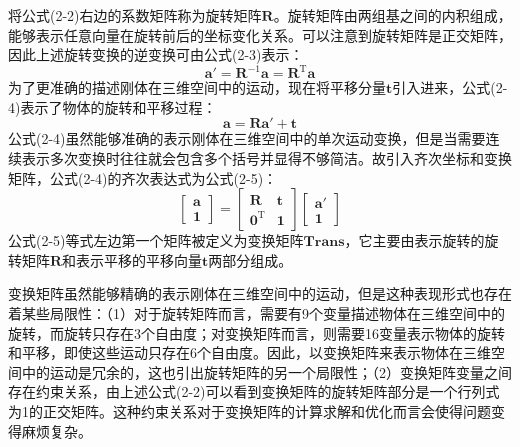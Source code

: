     将公式(2-2)右边的系数矩阵称为旋转矩阵$\mathbf{R}$。旋转矩阵由两组基之间的内积组成，能够表示任意向量在旋转前后的坐标变化关系。可以注意到旋转矩阵是正交矩阵，因此上述旋转变换的逆变换可由公式(2-3)表示：
    \begin{equation}
        \mathbf{a'} = \mathbf{R}^{-1}\mathbf{a} = \mathbf{R}^{\mathrm{T}}\mathbf{a}
    \end{equation}
    为了更准确的描述刚体在三维空间中的运动，现在将平移分量$\mathbf{t}$引入进来，公式(2-4)表示了物体的旋转和平移过程：
    \begin{equation}
        \mathbf{
        a = R a' + t
        }
    \end{equation}
    公式(2-4)虽然能够准确的表示刚体在三维空间中的单次运动变换，但是当需要连续表示多次变换时往往就会包含多个括号并显得不够简洁。故引入齐次坐标和变换矩阵，公式(2-4)的齐次表达式为公式(2-5)：
    \begin{equation}
        \mathbf{
        \begin{bmatrix}
            \mathbf{a} \\ 1
        \end{bmatrix}
        =
        \begin{bmatrix}
            \mathbf{R}   & \mathbf{t}\\
            0^\mathrm{T} & 1
        \end{bmatrix}
        \begin{bmatrix}
            \mathbf{a'} \\ 1
        \end{bmatrix}
        }
    \end{equation}
    公式(2-5)等式左边第一个矩阵被定义为变换矩阵$\mathbf{Trans}$，它主要由表示旋转的旋转矩阵$\mathbf{R}$和表示平移的平移向量$\mathbf{t}$两部分组成。\par
    变换矩阵虽然能够精确的表示刚体在三维空间中的运动，但是这种表现形式也存在着某些局限性：（1）对于旋转矩阵而言，需要有9个变量描述物体在三维空间中的旋转，而旋转只存在3个自由度；对变换矩阵而言，则需要16变量表示物体的旋转和平移，即使这些运动只存在6个自由度。因此，以变换矩阵来表示物体在三维空间中的运动是冗余的，这也引出旋转矩阵的另一个局限性；（2）变换矩阵变量之间存在约束关系，由上述公式(2-2)可以看到变换矩阵的旋转矩阵部分是一个行列式为1的正交矩阵。这种约束关系对于变换矩阵的计算求解和优化而言会使得问题变得麻烦复杂。

